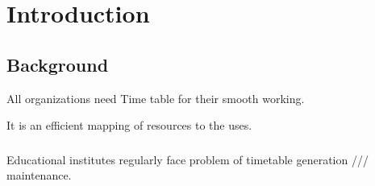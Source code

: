
\chapter{Introduction}
\section{Background}
 All organizations need Time table for their smooth working. 
 
 It is an efficient mapping of resources to the uses.
 
\subsection{}
 Educational institutes regularly face problem of timetable generation /// maintenance.